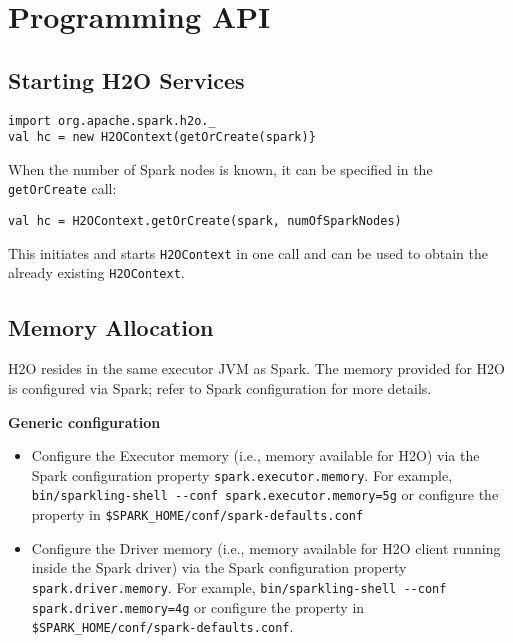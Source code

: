 \section{Programming API}

\subsection{Starting H2O Services}

\begin{lstlisting}[style=Scala]
import org.apache.spark.h2o._
val hc = new H2OContext(getOrCreate(spark)}
\end{lstlisting} 

When the number of Spark nodes is known, it can be specified in the \texttt{getOrCreate} call:

\begin{lstlisting}[style=Scala]
val hc = H2OContext.getOrCreate(spark, numOfSparkNodes)
\end{lstlisting}


This initiates and starts \texttt{H2OContext} in one call and can be used to obtain the already existing \texttt{H2OContext}. 

\subsection{Memory Allocation}

H2O resides in the same executor JVM as Spark. The memory provided for H2O is configured via Spark; refer to Spark configuration for more details.

\textbf{Generic configuration}

\begin{itemize}
\item Configure the Executor memory (i.e., memory available for H2O) via the Spark configuration property \texttt{spark.executor.memory}. For example, {\lstinline[style=Bash]|bin/sparkling-shell --conf spark.executor.memory=5g|} or configure the property in {\lstinline[style=Bash]|$SPARK_HOME/conf/spark-defaults.conf|}
\item Configure the Driver memory (i.e., memory available for H2O client running inside the Spark driver) via the Spark configuration property \texttt{spark.driver.memory}. For example, {\lstinline[style=Bash]|bin/sparkling-shell --conf spark.driver.memory=4g|} or configure the property in {\lstinline[style=Bash]|$SPARK_HOME/conf/spark-defaults.conf|}.
\end{itemize}

